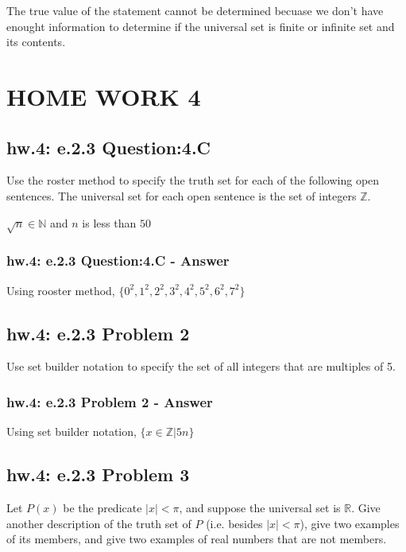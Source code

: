 The true value of the statement cannot be determined becuase we don't have enought information to determine if the universal set is finite or infinite set and its contents. 


\newpage
\section{HOME WORK 4}
\subsection{hw.4: e.2.3 Question:4.C}
Use the roster method to specify the truth set for each of the following open sentences. The universal set for each open sentence is the set of integers $\mathbb{Z}$. \\

\begin{center}
$\sqrt{n} \in \mathbb{N}$ and $n$ is less than $50$
\end{center}

\subsubsection*{hw.4: e.2.3 Question:4.C - Answer}
Using rooster method, $\{0^2, 1^2, 2^2, 3^2, 4^2, 5^2, 6^2, 7^2 \}$ \\


\subsection{hw.4: e.2.3 Problem 2}
Use set builder notation to specify the set of all integers that are multiples of 5. \\

\subsubsection*{hw.4: e.2.3 Problem 2 - Answer}

Using set builder notation, $\{x \in \mathbb{Z} | 5n \}$ 

\subsection{hw.4: e.2.3 Problem 3}

Let $P(x)$ be the predicate $|x|< \pi$, and suppose the universal set is $\mathbb{R}$. Give another description of the truth set of $P$ (i.e. besides $|x|< \pi$), give  two examples of its members, and give two examples of real numbers that are not members. \\

